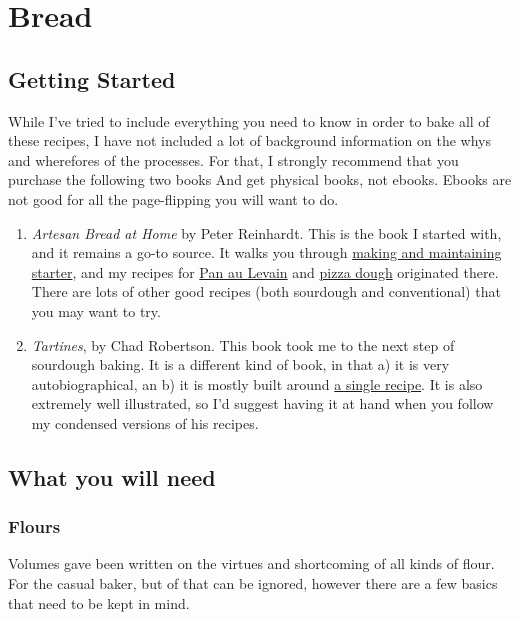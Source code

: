 \documentclass[
]{book}
\providecommand{\tightlist}{%
  \setlength{\itemsep}{0pt}\setlength{\parskip}{0pt}}
\begin{document}
\hypertarget{bread-1}{%
\chapter{Bread}\label{bread-1}}

\hypertarget{getting-started}{%
\section{Getting Started}\label{getting-started}}

While I've tried to include everything you need to know in order to bake all of these recipes, I have not included a lot of background information on the whys and wherefores of the processes. For that, I strongly recommend that you purchase the following two books And get physical books, not ebooks. Ebooks are not good for all the page-flipping you will want to do.

\begin{enumerate}
\def\labelenumi{\arabic{enumi}.}
\tightlist
\item
  \emph{Artesan Bread at Home} by Peter Reinhardt. This is the book I started with, and it remains a go-to source. It walks you through \protect\hyperlink{starter}{making and maintaining starter}, and my recipes for \protect\hyperlink{pal}{Pan au Levain} and \protect\hyperlink{pizzadough}{pizza dough} originated there. There are lots of other good recipes (both sourdough and conventional) that you may want to try.
\item
  \emph{Tartines}, by Chad Robertson. This book took me to the next step of sourdough baking. It is a different kind of book, in that a) it is very autobiographical, an b) it is mostly built around \protect\hyperlink{tartines}{a single recipe}. It is also extremely well illustrated, so I'd suggest having it at hand when you follow my condensed versions of his recipes.
\end{enumerate}

\hypertarget{what-you-will-need}{%
\section{What you will need}\label{what-you-will-need}}

\hypertarget{flour}{%
\subsection{Flours}\label{flour}}

Volumes gave been written on the virtues and shortcoming of all kinds of flour. For the casual baker, but of that can be ignored, however there are a few basics that need to be kept in mind.
\end{document}
